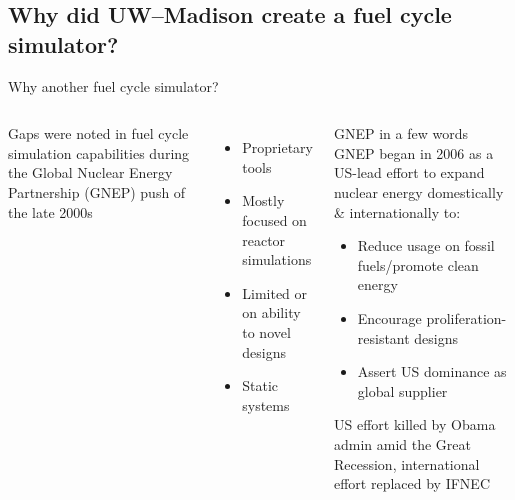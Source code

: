 \subsection{Why did UW--Madison create a fuel cycle simulator?}
\begin{frame}{Why another fuel cycle simulator?}
\begin{columns}
    Gaps were noted in fuel cycle simulation capabilities during the Global Nuclear Energy Partnership (GNEP) push of the late 2000s
    \begin{itemize}
        \item Proprietary tools
        \item Mostly focused on reactor simulations
        \item Limited or on ability to novel designs
        \item Static systems
    \end{itemize}
    \begin{block}{GNEP in a few words}
        \footnotesize
        \alert{GNEP} began in 2006 as a US-lead effort to expand nuclear energy domestically \& internationally to:
        \begin{itemize}
            \item Reduce usage on fossil fuels/promote clean energy
            \item Encourage proliferation- resistant designs
            \item Assert US dominance as global supplier
        \end{itemize}
        US effort killed by Obama admin amid the Great Recession, international effort replaced by IFNEC
    \end{block}
\end{columns}
\end{frame}
